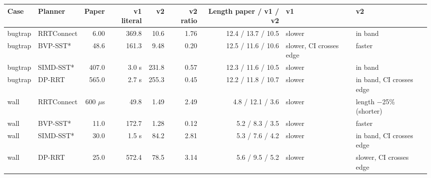 \documentclass[border=4pt]{standalone}
\begin{document}
\begin{tabular}{llrrrrrll}
\toprule
\textbf{Case} & \textbf{Planner} & \textbf{Paper} & \textbf{v1 literal} & \textbf{v2} & \textbf{v2 ratio} & \textbf{Length paper / v1 / v2} & \textbf{v1} & \textbf{v2} \\
\midrule
bugtrap & RRTConnect & 6.00 & 369.8 & 10.6 & 1.76 & 12.4 / 13.7 / 10.5 & slower & in band \\
bugtrap & BVP-SST* & 48.6 & 161.3 & 9.48 & 0.20 & 12.5 / 11.6 / 10.6 & slower, CI crosses edge & faster \\
bugtrap & SIMD-SST* & 407.0 & 3.0 s & 231.8 & 0.57 & 12.3 / 11.6 / 10.5 & slower & in band \\
bugtrap & DP-RRT & 565.0 & 2.7 s & 255.3 & 0.45 & 12.2 / 11.8 / 10.7 & slower & in band, CI crosses edge \\
\midrule
wall & RRTConnect & 600 $\mu$s & 49.8 & 1.49 & 2.49 & 4.8 / 12.1 / 3.6 & slower & length −25\% (shorter) \\
wall & BVP-SST* & 11.0 & 172.7 & 1.28 & 0.12 & 5.2 / 8.3 / 3.5 & slower & faster \\
wall & SIMD-SST* & 30.0 & 1.5 s & 84.2 & 2.81 & 5.3 / 7.6 / 4.2 & slower & in band, CI crosses edge \\
wall & DP-RRT & 25.0 & 572.4 & 78.5 & 3.14 & 5.6 / 9.5 / 5.2 & slower & slower, CI crosses edge \\
\bottomrule
\end{tabular}
\end{document}

